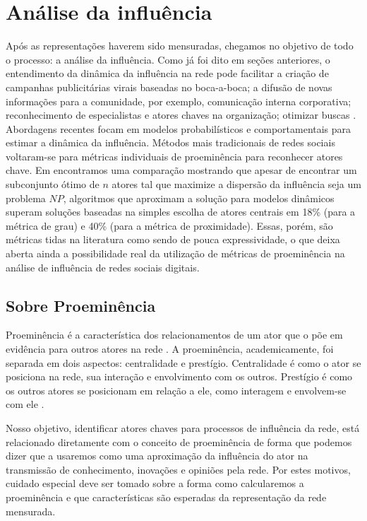 \chapter{Análise da influência}
\label{ch:mineracao}

Após as representações haverem sido mensuradas, chegamos no objetivo de todo o
processo: a análise da influência. Como já foi dito em seções anteriores, o
entendimento da dinâmica da influência na rede pode facilitar a criação de
campanhas publicitárias virais baseadas no boca-a-boca; a difusão de novas
informações para a comunidade, por exemplo, comunicação interna corporativa;
reconhecimento de especialistas e atores chaves na organização; otimizar buscas
\citep{Kirchhoff2009}. Abordagens recentes focam em modelos probabilísticos e
comportamentais para estimar a dinâmica da influência. Métodos mais tradicionais
de redes sociais voltaram-se para métricas individuais de proeminência para
reconhecer atores chave. Em \citet{Kempe2003} encontramos uma comparação
mostrando que apesar de encontrar um subconjunto ótimo de $n$ atores tal que
maximize a dispersão da influência seja um problema $NP$, algoritmos que
aproximam a solução para modelos dinâmicos superam soluções baseadas na simples
escolha de atores centrais em 18\% (para a métrica de grau) e 40\% (para a
métrica de proximidade). Essas, porém, são métricas tidas na literatura como
sendo de pouca expressividade, o que deixa aberta ainda a possibilidade real da
utilização de métricas de proeminência na análise de influência de redes sociais
digitais.

\section{Sobre Proeminência}

Proeminência é a característica dos relacionamentos de um ator que o põe em
evidência para outros atores na rede \citep{Wasserman}. A proeminência,
academicamente, foi separada em dois aspectos: centralidade e prestígio.
Centralidade é como o ator se posiciona na rede, sua interação e envolvimento com
os outros. Prestígio é como os outros atores se posicionam em relação a ele, como
interagem e envolvem-se com ele \citep{Knoke1983}.

Nosso objetivo, identificar atores chaves para processos de influência da rede,
está relacionado diretamente com o conceito de proeminência de forma que podemos
dizer que a usaremos como uma aproximação da influência do ator na transmissão de
conhecimento, inovações e opiniões pela rede. Por estes motivos, cuidado especial
deve ser tomado sobre a forma como calcularemos a proeminência e que
características são esperadas da representação da rede mensurada.

